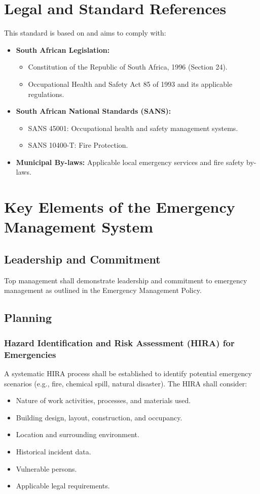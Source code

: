 \documentclass[11pt]{article}
\begin{document}
\section{Legal and Standard References}
This standard is based on and aims to comply with:
\begin{itemize}
    \item \textbf{South African Legislation:}
    \begin{itemize}
        \item Constitution of the Republic of South Africa, 1996 (Section 24).
        \item Occupational Health and Safety Act 85 of 1993 and its applicable regulations.
    \end{itemize}
    \item \textbf{South African National Standards (SANS):}
    \begin{itemize}
        \item SANS 45001: Occupational health and safety management systems.
        \item SANS 10400-T: Fire Protection.
    \end{itemize}
    \item \textbf{Municipal By-laws:} Applicable local emergency services and fire safety by-laws.
\end{itemize}

\section{Key Elements of the Emergency Management System}

\subsection{Leadership and Commitment}
Top management shall demonstrate leadership and commitment to emergency management as outlined in the Emergency Management Policy.

\subsection{Planning}

\subsubsection{Hazard Identification and Risk Assessment (HIRA) for Emergencies}
A systematic HIRA process shall be established to identify potential emergency scenarios (e.g., fire, chemical spill, natural disaster). The HIRA shall consider:
\begin{itemize}
    \item Nature of work activities, processes, and materials used.
    \item Building design, layout, construction, and occupancy.
    \item Location and surrounding environment.
    \item Historical incident data.
    \item Vulnerable persons.
    \item Applicable legal requirements.
\end{itemize}
\end{document}
